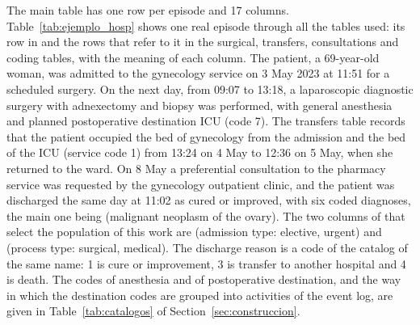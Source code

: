 The main table  has one row per episode and 17 columns. Table~\ref{tab:ejemplo_hosp} shows one real episode through all the tables used: its row in  and the rows that refer to it in the surgical, transfers, consultations and coding tables, with the meaning of each column. The patient, a 69-year-old woman, was admitted to the gynecology service on 3 May 2023 at 11:51 for a scheduled surgery. On the next day, from 09:07 to 13:18, a laparoscopic diagnostic surgery with adnexectomy and biopsy was performed, with general anesthesia and planned postoperative destination ICU (code 7). The transfers table records that the patient occupied the bed  of gynecology from the admission and the bed  of the ICU (service code 1) from 13:24 on 4 May to 12:36 on 5 May, when she returned to the ward. On 8 May a preferential consultation to the pharmacy service was requested by the gynecology outpatient clinic, and the patient was discharged the same day at 11:02 as cured or improved, with six coded diagnoses, the main one being  (malignant neoplasm of the ovary). The two columns of  that select the population of this work are  (admission type:  elective,  urgent) and  (process type:  surgical,  medical). The discharge reason  is a code of the catalog of the same name: 1 is cure or improvement, 3 is transfer to another hospital and 4 is death. The codes of anesthesia and of postoperative destination, and the way in which the destination codes are grouped into activities of the event log, are given in Table~\ref{tab:catalogos} of Section~\ref{sec:construccion}.

